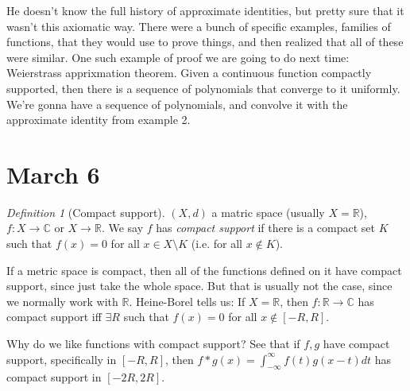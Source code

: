 \documentclass{article}
\theoremstyle{plain}
\theoremstyle{remark}
\newtheorem{definition}{Definition}
\newcommand{\R}{{\mathbb R}}
\newcommand{\C}{{\mathbb C}}
\begin{document}
He doesn't know the full history of approximate identities,
but pretty sure that it wasn't this axiomatic way.
There were a bunch of specific examples, families of functions,
that they would use to prove things,
and then realized that all of these were similar.
One such example of proof we are going to do next time:
Weierstrass apprixmation theorem.
Given a continuous function compactly supported,
then there is a sequence of polynomials that converge to it uniformly.
We're gonna have a sequence of polynomials, and convolve it with the
approximate identity from example 2.


\section{March 6}
\begin{definition}[Compact support]
	$(X,d)$ a matric space (usually $X = \R$),
	$f \colon X \to \C$ or $X \to \R$.
	We say $f$ has \emph{compact support} if there is a compact set $K$
	such that $f(x) = 0$ for all $x \in X \setminus K$ (i.e. for all $x \not\in K$).
\end{definition}
If a metric space is compact, then all of the functions defined on it
have compact support, since just take the whole space.
But that is usually not the case, since we normally work with $\R$.
Heine-Borel tells us:
If $X = \R$, then $f \colon \R \to \C$ has compact support iff $\exists R$ such that
$f(x) = 0$ for all $x \not\in [-R,R]$.

Why do we like functions with compact support?
See that if $f,g$ have compact support, specifically in $[-R,R]$,
then $f * g(x) = \int_{-\infty}^\infty f(t)g(x-t)dt$
has compact support in $[-2R,2R]$.
\end{document}
